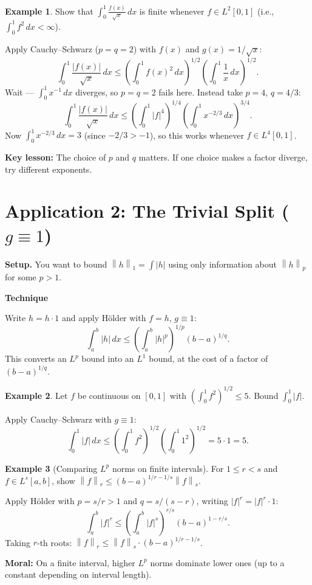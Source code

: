 \documentclass[11pt]{article}
\newcommand{\norm}[2]{\left\|#1\right\|_{#2}}
\theoremstyle{myplain}
\theoremstyle{definition}
\newtheorem{example}{Example}
\theoremstyle{remark}
\newenvironment{technique}{%
  \par\smallskip
  \noindent\colorbox{Apricot}{\textbf{Technique}}\enspace\ignorespaces
}{\par\smallskip}
\begin{document}
\begin{example}
Show that $\displaystyle\int_0^1 \frac{f(x)}{\sqrt{x}}\,dx$ is finite whenever $f \in L^2[0,1]$ (i.e., $\int_0^1 f^2\,dx < \infty$).

Apply Cauchy--Schwarz ($p = q = 2$) with $f(x)$ and $g(x) = 1/\sqrt{x}$:
\[
  \int_0^1 \frac{|f(x)|}{\sqrt{x}}\,dx \leq \left(\int_0^1 f(x)^2\,dx\right)^{1/2}\!\left(\int_0^1 \frac{1}{x}\,dx\right)^{1/2}.
\]
Wait --- $\int_0^1 x^{-1}\,dx$ diverges, so $p = q = 2$ fails here. Instead take $p = 4$, $q = 4/3$:
\[
  \int_0^1 \frac{|f(x)|}{\sqrt{x}}\,dx \leq \left(\int_0^1 |f|^4\right)^{1/4}\!\left(\int_0^1 x^{-2/3}\,dx\right)^{3/4}.
\]
Now $\int_0^1 x^{-2/3}\,dx = 3$ (since $-2/3 > -1$), so this works whenever $f \in L^4[0,1]$.

\textbf{Key lesson:} The choice of $p$ and $q$ matters. If one choice makes a factor diverge, try different exponents.
\end{example}

\section{Application 2: The Trivial Split ($g \equiv 1$)}

\textbf{Setup.} You want to bound $\norm{h}{1} = \int|h|$ using only information about $\norm{h}{p}$ for some $p > 1$.

\begin{technique}
Write $h = h \cdot 1$ and apply H\"{o}lder with $f = h$, $g \equiv 1$:
\[
  \int_a^b |h|\,dx \leq \left(\int_a^b |h|^p\right)^{1/p}(b-a)^{1/q}.
\]
This converts an $L^p$ bound into an $L^1$ bound, at the cost of a factor of $(b-a)^{1/q}$.
\end{technique}

\begin{example}
Let $f$ be continuous on $[0,1]$ with $\left(\int_0^1 f^2\right)^{1/2} \leq 5$. Bound $\int_0^1 |f|$.

Apply Cauchy--Schwarz with $g \equiv 1$:
\[
  \int_0^1 |f|\,dx \leq \left(\int_0^1 f^2\right)^{1/2}\!\left(\int_0^1 1^2\right)^{1/2} = 5 \cdot 1 = 5.
\]
\end{example}

\begin{example}[Comparing $L^p$ norms on finite intervals]
For $1 \leq r < s$ and $f \in L^s[a,b]$, show $\norm{f}{r} \leq (b-a)^{1/r - 1/s}\norm{f}{s}$.

Apply H\"{o}lder with $p = s/r > 1$ and $q = s/(s-r)$, writing $|f|^r = |f|^r \cdot 1$:
\[
  \int_a^b |f|^r \leq \left(\int_a^b |f|^s\right)^{r/s}(b-a)^{1-r/s}.
\]
Taking $r$-th roots: $\norm{f}{r} \leq \norm{f}{s}\cdot(b-a)^{1/r - 1/s}$.

\textbf{Moral:} On a finite interval, higher $L^p$ norms dominate lower ones (up to a constant depending on interval length).
\end{example}
\end{document}
